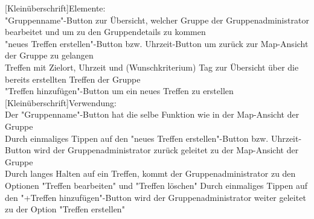 [Kleinüberschrift]Elemente:\\
"Gruppenname"-Button zur Übersicht, welcher Gruppe der Gruppenadministrator bearbeitet und um zu den Gruppendetails zu kommen\\
"neues Treffen erstellen"-Button bzw. Uhrzeit-Button um zurück zur Map-Ansicht der Gruppe zu gelangen\\
Treffen mit Zielort, Uhrzeit und (Wunschkriterium) Tag zur Übersicht über die bereits erstellten Treffen der Gruppe\\
"Treffen hinzufügen"-Button um ein neues Treffen zu erstellen
[Kleinüberschrift]Verwendung:\\
Der "Gruppenname"-Button  hat die selbe Funktion wie in der Map-Ansicht der Gruppe\\
Durch einmaliges Tippen auf den "neues Treffen erstellen"-Button bzw. Uhrzeit-Button wird der Gruppenadministrator zurück geleitet zu der Map-Ansicht der Gruppe\\
Durch langes Halten auf ein Treffen, kommt der Gruppenadministrator zu den Optionen "Treffen bearbeiten" und "Treffen löschen"
Durch einmaliges Tippen auf den "+Treffen hinzufügen"-Button wird der Gruppenadministrator weiter geleitet zu der Option "Treffen erstellen"\\ \\

